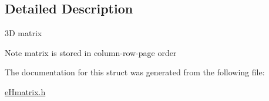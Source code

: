 \subsection{Detailed Description}
3\-D matrix 

\begin{DoxyNote}{Note}
matrix is stored in column-\/row-\/page order 
\end{DoxyNote}


The documentation for this struct was generated from the following file\-:\begin{DoxyCompactItemize}
\item 
\hyperlink{eHmatrix_8h}{e\-Hmatrix.\-h}\end{DoxyCompactItemize}
